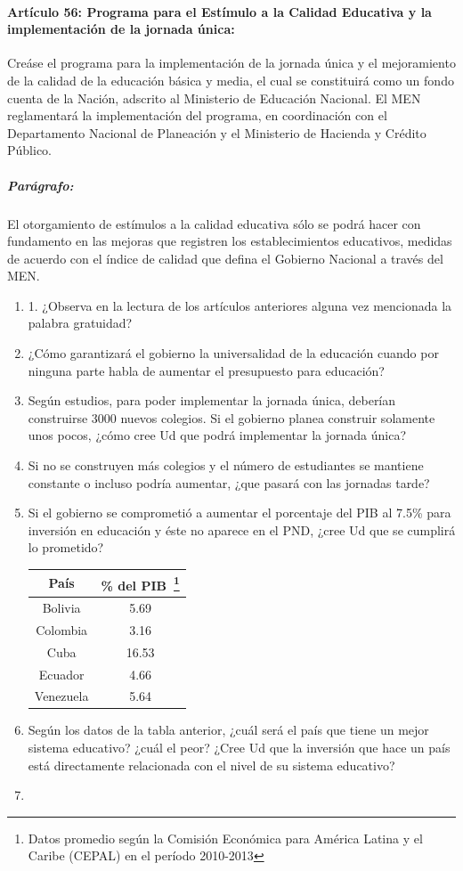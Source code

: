 \documentclass[10pt,twoside]{article}
\begin{document}
\paragraph*{Artículo 56: Programa para el Estímulo a la Calidad Educativa y la implementación de la jornada única:} Creáse el programa para la implementación de la jornada única y el mejoramiento de la calidad de la educación básica y media, el cual se constituirá como un fondo cuenta de la Nación, adscrito al Ministerio de Educación Nacional. El MEN reglamentará la implementación del programa, en coordinación con el Departamento Nacional de Planeación y el Ministerio de Hacienda y Crédito Público.
\subparagraph*{Parágrafo:} El otorgamiento de estímulos a la calidad educativa sólo se podrá hacer con fundamento en las mejoras que registren los establecimientos educativos, medidas de acuerdo con el índice de calidad que defina el Gobierno Nacional a través del MEN.
\begin{enumerate}
\item 1. ¿Observa en la lectura de los artículos anteriores alguna vez mencionada la palabra gratuidad?
\item ¿Cómo garantizará el gobierno la universalidad de la educación cuando por ninguna parte habla de aumentar el presupuesto para educación?
\item Según estudios, para poder implementar la jornada única, deberían construirse 3000 nuevos colegios. Si el gobierno planea construir solamente unos pocos, ¿cómo cree Ud que podrá implementar la jornada única?
\item Si no se construyen más colegios y el número de estudiantes se mantiene constante o incluso podría aumentar, ¿que pasará con las jornadas tarde?
\item Si el gobierno se comprometió a aumentar el porcentaje del PIB al 7.5\% para inversión en educación y éste no aparece en el PND, ¿cree Ud que se cumplirá lo prometido?
\begin{center}
\begin{tabular}{|c|c|}
\hline 
País & \% del PIB~\footnote{Datos promedio según la Comisión Económica para América Latina y el Caribe (CEPAL) en el período 2010-2013} \\ 
\hline 
Bolivia & 5.69 \\ 
\hline 
Colombia & 3.16 \\ 
\hline 
Cuba & 16.53 \\ 
\hline 
Ecuador & 4.66 \\ 
\hline 
Venezuela & 5.64 \\ 
\hline 
\end{tabular}
\end{center}
\item Según los datos de la tabla anterior, ¿cuál será el país que tiene un mejor sistema educativo? ¿cuál el peor? ¿Cree Ud que la inversión que hace un país está directamente relacionada con el nivel de su sistema educativo?
\item 
\end{enumerate}
\end{document}
